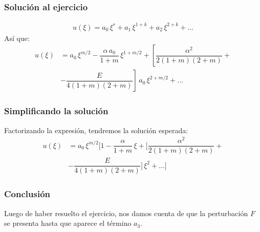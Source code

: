 \begin{frame}
\frametitle{Solución al ejercicio}
\vspace*{-1cm}
\begin{align*}
u(\xi) = a_{0} \, \xi^{r} + a_{1} \, \xi ^{1+k} + a_{2} \, \xi ^{2+k} + \ldots 
\end{align*}
\pause
Así que:   
\begin{align*}
u(\xi) &= a_{0} \, \xi^{m/2} - \dfrac{\alpha \, a_{0}}{1+m} \, \xi^{1+m/2} + \left[ \dfrac{\alpha^{2}}{2(1+m)(2+m)} + \right. \\[0.5em]
&- \left. \dfrac{E}{4(1+m)(2+m)} \right] \, a_{0} \, \xi^{2+m/2} + \ldots
\end{align*}
\end{frame}
\begin{frame}
\frametitle{Simplificando la solución}
Factorizando la expresión, tendremos la solución esperada:
\begin{align*}
u(\xi) &= a_{0} \, \xi^{m/2}  \bigg[ 1 - \dfrac{\alpha}{1+m} \, \xi + \bigg[ \dfrac{\alpha^{2}}{2(1+m)(2+m)} + \\[0.5em]
&- \dfrac{E}{4(1+m)(2+m)} \bigg] \, \xi^{2} + \ldots \bigg]
\end{align*}
\end{frame}
\begin{frame}
\frametitle{Conclusión}
Luego de haber resuelto el ejercicio, nos damos cuenta de que la perturbación $F$ se presenta hasta que aparece el término $a_{3}$.
\end{frame}
